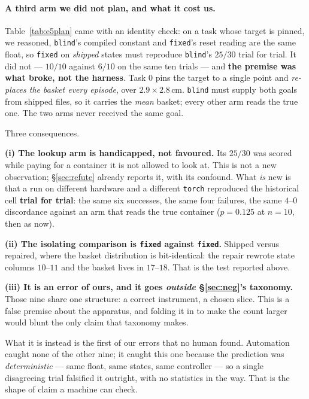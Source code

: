 \documentclass[10pt,twocolumn]{article}
\begin{document}
\paragraph{A third arm we did not plan, and what it cost us.}
Table~\ref{tab:e5plan} came with an identity check: on a task whose target is
pinned, we reasoned, \texttt{blind}'s compiled constant and \texttt{fixed}'s
reset reading are the same float, so \texttt{fixed} on \emph{shipped} states
must reproduce \texttt{blind}'s $25/30$ trial for trial. It did not --- $10/10$
against $6/10$ on the same ten trials --- and \textbf{the premise was what
broke, not the harness}. Task $0$ pins the target to a single point and
\emph{re-places the basket every episode}, over $2.9\times2.8$\,cm.
\texttt{blind} must supply both goals from shipped files, so it carries the
\emph{mean} basket; every other arm reads the true one. The two arms never
received the same goal.

Three consequences.

\textbf{(i) The lookup arm is handicapped, not favoured.} Its $25/30$ was
scored while paying for a container it is not allowed to look at. This is not a
new observation; \S\ref{sec:refute} already reports it, with its confound. What
\emph{is} new is that a run on different hardware and a different
\texttt{torch} reproduced the historical cell \textbf{trial for trial}: the
same six successes, the same four failures, the same $4$--$0$ discordance
against an arm that reads the true container ($p = 0.125$ at $n{=}10$, then as
now).

\textbf{(ii) The isolating comparison is \texttt{fixed} against
\texttt{fixed}.} Shipped versus repaired, where the basket distribution is
bit-identical: the repair rewrote state columns $10$--$11$ and the basket
lives in $17$--$18$. That is the test reported above.

\textbf{(iii) It is an error of ours, and it goes \emph{outside}
\S\ref{sec:neg}'s taxonomy.} Those nine share one structure: a correct
instrument, a chosen slice. This is a false premise about the apparatus, and
folding it in to make the count larger would blunt the only claim that taxonomy
makes.

What it is instead is the first of our errors that no human found. Automation
caught none of the other nine; it caught this one because the prediction was
\emph{deterministic} --- same float, same states, same controller --- so a
single disagreeing trial falsified it outright, with no statistics in the way.
That is the shape of claim a machine can check.
\end{document}
